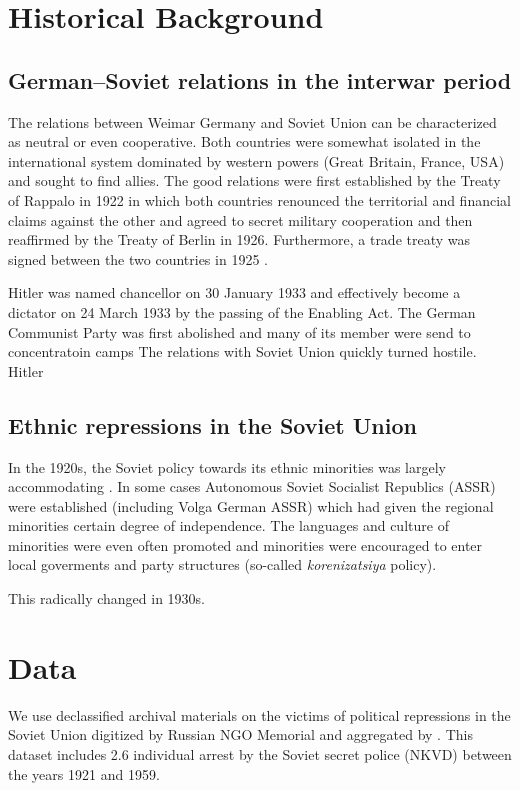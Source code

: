 \documentclass[12pt]{article}
\begin{document}
\section{Historical Background}
\subsection{German–Soviet relations in the interwar period}
The relations between Weimar Germany and Soviet Union can be characterized as neutral or even cooperative. Both countries were somewhat isolated in the international system dominated by western powers (Great Britain, France, USA) and sought to find allies. The good relations were first established by the Treaty of Rappalo in 1922 in which both countries renounced the territorial and financial claims against the other and agreed to secret military cooperation and then reaffirmed by the Treaty of Berlin in 1926. Furthermore, a trade treaty was signed between the two countries in 1925 \citep{morgan_political_1963}.

Hitler was named chancellor on 30 January 1933 and effectively become a dictator on 24 March 1933 by the passing of the Enabling Act. The German Communist Party was first abolished and many of its member were send to concentratoin camps
The relations with Soviet Union quickly turned hostile. Hitler 

\subsection{Ethnic repressions in the Soviet Union}
In the 1920s, the Soviet policy towards its ethnic minorities was largely accommodating \citep{martin_affirmative_2001}. In some cases Autonomous Soviet Socialist Republics (ASSR) were established (including Volga German ASSR) which had given the regional minorities certain degree of independence. The languages and culture of minorities were even often promoted and minorities were encouraged to enter local goverments and party structures (so-called \emph{korenizatsiya} policy). 

This radically changed in 1930s. \citep{snyder_bloodlands:_2011}
\section{Data}
We use declassified archival materials on the victims of political repressions in the Soviet Union digitized by Russian NGO Memorial and aggregated by \citet{zhukov_stalins_2018}. This dataset includes 2.6 individual arrest by the Soviet secret police (NKVD) between  the years 1921 and 1959.
\end{document}
